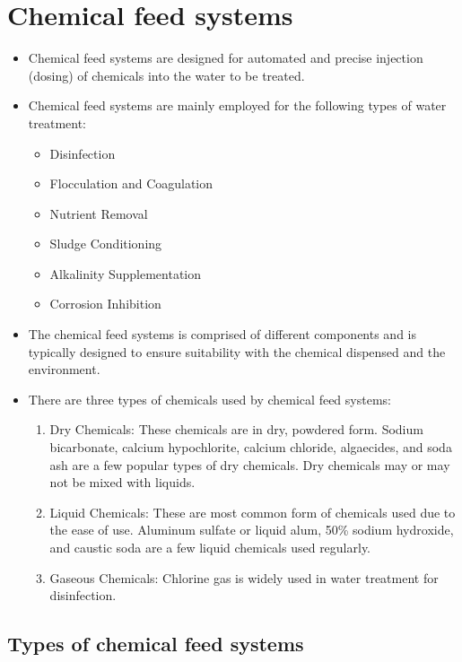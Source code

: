 \section{Chemical feed systems} 
\begin{itemize}
\item Chemical feed systems are designed for automated and precise injection (dosing) of chemicals into the water to be treated. 
\item Chemical feed systems are mainly employed for the following types of water treatment:
\begin{itemize}
\item Disinfection
\item Flocculation and Coagulation
\item Nutrient Removal
\item Sludge Conditioning
\item Alkalinity Supplementation
\item Corrosion Inhibition
\end{itemize}
\item The chemical feed systems is comprised of different components and is typically designed to ensure suitability with the chemical dispensed and the environment.
\item There are three types of chemicals used by chemical feed systems: 
\begin{enumerate}
\item Dry Chemicals: These chemicals are in dry, powdered form. Sodium bicarbonate, calcium hypochlorite, calcium chloride, algaecides, and soda ash are a few popular types of dry chemicals. Dry chemicals may or may not be mixed with liquids.
\item Liquid Chemicals: These are most common form of chemicals used due to the ease of use. Aluminum sulfate or liquid alum, 50\% sodium hydroxide, and caustic soda are a few liquid chemicals used regularly.
\item Gaseous Chemicals: Chlorine gas is widely used in water treatment for disinfection.
\end{enumerate}
\end{itemize}

\subsection {Types of chemical feed systems}

